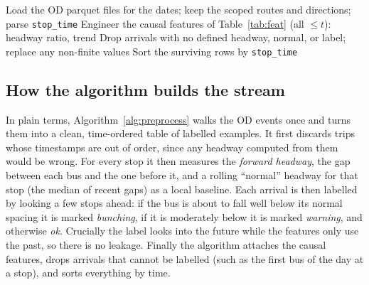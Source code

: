 \documentclass[final,5p,times,twocolumn,authoryear]{elsarticle}
\begin{document}
\begin{algorithm*}[t]
\footnotesize
\DontPrintSemicolon
{}
\BlankLine
Load the OD parquet files for the dates; keep the scoped routes and directions; parse \texttt{stop\_time}\;
Engineer the causal features of Table~\ref{tab:feat} (all $\le t$): headway ratio, trend\;
Drop arrivals with no defined headway, normal, or label; replace any non-finite values\;
Sort the surviving rows by \texttt{stop\_time}\;
\caption{Constructing the streaming dataset from SUNT OD.}
\label{alg:preprocess}
\end{algorithm*}

\subsection{How the algorithm builds the stream}
\label{sec:build-stream}

In plain terms, Algorithm~\ref{alg:preprocess} walks the OD events once and turns them into a clean,
time-ordered table of labelled examples. It first discards trips whose timestamps are out of order,
since any headway computed from them would be wrong. For every stop it then measures the
\emph{forward headway}, the gap between each bus and the one before it, and a rolling ``normal''
headway for that stop (the median of recent gaps) as a local baseline. Each arrival is then labelled
by looking a few stops ahead: if the bus is about to fall well below its normal spacing it is marked
\emph{bunching}, if it is moderately below it is marked \emph{warning}, and otherwise \emph{ok}.
Crucially the label looks into the future while the features only use the past, so there is no
leakage. Finally the algorithm attaches the causal features, drops arrivals that cannot be labelled
(such as the first bus of the day at a stop), and sorts everything by time.
\end{document}
